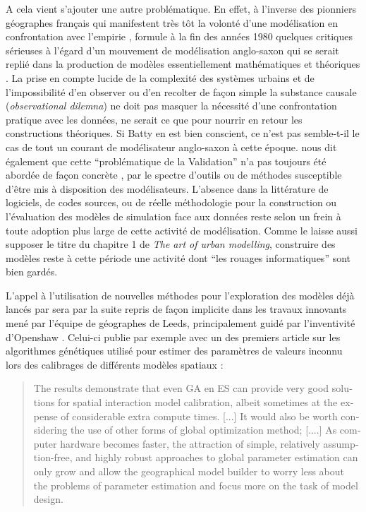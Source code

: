 A cela vient s'ajouter une autre problématique. En effet, à l'inverse des pionniers géographes français qui manifestent très tôt la volonté d'une modélisation en confrontation avec l'empirie \autocites{Pumain1983,AMORAL1983}, \textcite{Openshaw1989} formule à la fin des années 1980 quelques critiques sérieuses à l'égard d'un mouvement de modélisation anglo-saxon qui se serait replié dans la production de modèles essentiellement mathématiques et théoriques . La prise en compte lucide de la complexité des systèmes urbains et de l'impossibilité d'en observer ou d'en recolter de façon simple la substance causale (\textit{observational dilemna}) ne doit pas masquer la nécessité d'une confrontation pratique avec les données, ne serait ce que pour nourrir en retour les constructions théoriques. Si Batty en est bien conscient, ce n'est pas semble-t-il le cas de tout un courant de modélisateur anglo-saxon à cette époque. \textcite{Openshaw1989} nous dit également que cette \enquote{problématique de la Validation} n'a pas toujours été abordée de façon concrète , par le spectre d'outils ou de méthodes susceptible d'être mis à disposition des modélisateurs. L'absence dans la littérature de logiciels, de codes sources, ou de réelle méthodologie pour la construction ou l'évaluation des modèles de simulation face aux données reste selon \textcite{Openshaw1989} un frein à toute adoption plus large de cette activité de modélisation. Comme le laisse aussi supposer le titre du chapitre 1 de \textcite{Batty1976} \textit{The art of urban modelling}, construire des modèles reste à cette période une activité dont \enquote{les rouages informatiques} sont bien gardés. %

L'appel à l'utilisation de nouvelles méthodes pour l'exploration des modèles déjà lancés par \textcite{Batty1976} sera par la suite repris de façon implicite dans les travaux innovants mené par l'équipe de géographes de Leeds, principalement guidé par l'inventivité d'Openshaw \autocites{Openshaw1983, Openshaw1988, Diplock1996, Turton1998}. Celui-ci publie par exemple avec \textcite{Diplock1996} un des premiers article sur les algorithmes génétiques utilisé pour estimer des paramètres de valeurs inconnu lors des calibrages de différents modèles spatiaux :

\foreignblockquote{english}[\cite{Diplock1996}]{The results demonstrate that even GA en ES can provide very good solutions for spatial interaction model calibration, albeit sometimes at the expense of considerable extra compute times. [...] It would also be worth considering the use of other forms of global optimization method; [....] As computer hardware becomes faster, the attraction of simple, relatively assumption-free, and highly robust approaches to global parameter estimation can only grow and allow the geographical model builder to worry less about the problems of parameter estimation and focus more on the task of model design.}

